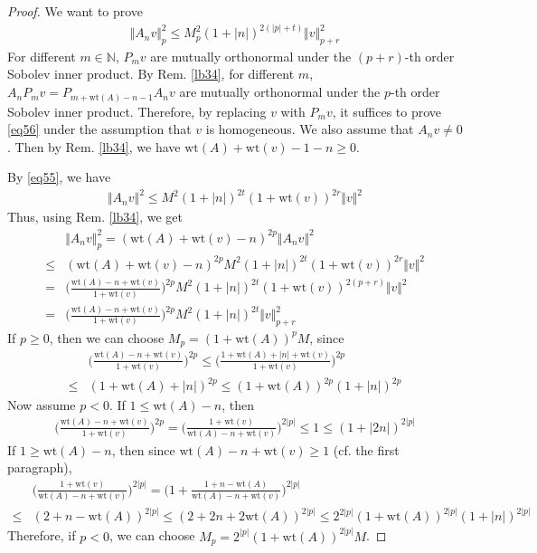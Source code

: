 \documentclass[12pt,b5paper,notitlepage]{article}
\theoremstyle{definition}
\theoremstyle{plain}
\newcommand{\Nbb}{\mathbb N}
\newcommand{\wt}{\mathrm{wt}}
\numberwithin{equation}{section}
\begin{document}
\begin{proof}
We want to prove
\begin{align*}
\Vert A_nv\Vert_p^2\leq M_p^2(1+|n|)^{2(|p|+t)}\Vert v\Vert_{p+r}^2  \tag{a}\label{eq56}
\end{align*}
For different $m\in\Nbb$, $P_mv$ are mutually orthonormal under the $(p+r)$-th order Sobolev inner product. By Rem. \ref{lb34}, for different $m$, $A_nP_mv=P_{m+\wt(A)-n-1}A_nv$ are mutually orthonormal under the $p$-th order Sobolev inner product. Therefore, by replacing $v$ with $P_mv$, it suffices to prove \eqref{eq56} under the assumption that $v$ is homogeneous. We also assume that $A_nv\neq 0$. Then by Rem. \ref{lb34}, we have $\wt(A)+\wt(v)-1-n\geq0$.

By \eqref{eq55}, we have
\begin{align*}
\Vert A_nv\Vert^2\leq M^2(1+|n|)^{2t}(1+\wt(v))^{2r}\Vert v\Vert^2
\end{align*}
Thus, using Rem. \ref{lb34}, we get
\begin{align*}
&\Vert A_nv\Vert^2_p=(\wt(A)+\wt(v)-n)^{2p}\Vert A_nv\Vert^2\\
\leq& (\wt(A)+\wt(v)-n)^{2p}M^2(1+|n|)^{2t}(1+\wt(v))^{2r}\Vert v\Vert^2\\
=&\Big(\frac{\wt(A)-n+\wt(v)}{1+\wt(v)}\Big)^{2p}M^2(1+|n|)^{2t}(1+\wt(v))^{2(p+r)}\Vert v\Vert^2\\
=&\Big(\frac{\wt(A)-n+\wt(v)}{1+\wt(v)}\Big)^{2p}M^2(1+|n|)^{2t}\Vert v\Vert^2_{p+r}
\end{align*}
If $p\geq0$, then we can choose $M_p=(1+\wt(A))^pM$, since
\begin{align*}
&\Big(\frac{\wt(A)-n+\wt(v)}{1+\wt(v)}\Big)^{2p}\leq \Big(\frac{1+\wt(A)+|n|+\wt(v)}{1+\wt(v)}\Big)^{2p}\\
\leq&(1+\wt(A)+|n|)^{2p}\leq (1+\wt(A))^{2p}(1+|n|)^{2p}
\end{align*}
Now assume $p<0$. If $1\leq \wt(A)-n$, then
\begin{align*}
\Big(\frac{\wt(A)-n+\wt(v)}{1+\wt(v)}\Big)^{2p}=\Big(\frac{1+\wt(v)} {\wt(A)-n+\wt(v)}\Big)^{2|p|}\leq 1\leq (1+|2n|)^{2|p|}
\end{align*}
If $1\geq \wt(A)-n$, then since $\wt(A)-n+\wt(v)\geq1$ (cf. the first paragraph),
\begin{align*}
&\Big(\frac{1+\wt(v)} {\wt(A)-n+\wt(v)}\Big)^{2|p|}=\Big(1+\frac{1+n-\wt(A)} {\wt(A)-n+\wt(v)}\Big)^{2|p|}\\
\leq&(2+n-\wt(A))^{2|p|}\leq (2+2n+2\wt(A))^{2|p|}\leq 2^{2|p|}(1+\wt(A))^{2|p|}(1+|n|)^{2|p|}
\end{align*}
Therefore, if $p<0$, we can choose $M_p=2^{|p|}(1+\wt(A))^{2|p|}M$.
\end{proof}
\end{document}
